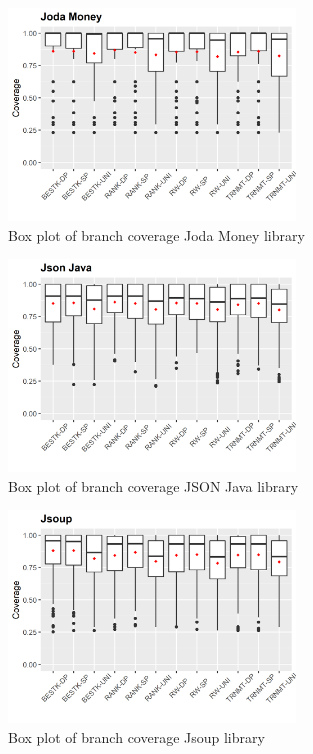\documentclass[sigconf]{acmart}
\begin{document}
\begin{figure}[h]
  \centering
  \includegraphics[width=3in]{../output/joda-money-boxplot.png}
  \caption{Box plot of branch coverage Joda Money library}
  \label{fig:boxplot5}
\end{figure}

\begin{figure}[h]
  \centering
  \includegraphics[width=3in]{../output/json-java-boxplot.png}
  \caption{Box plot of branch coverage JSON Java library}
  \label{fig:boxplot6}
\end{figure}

\begin{figure}[h]
  \centering
  \includegraphics[width=3in]{../output/jsoup-boxplot.png}
  \caption{Box plot of branch coverage Jsoup library}
  \label{fig:boxplot7}
\end{figure}
\end{document}
